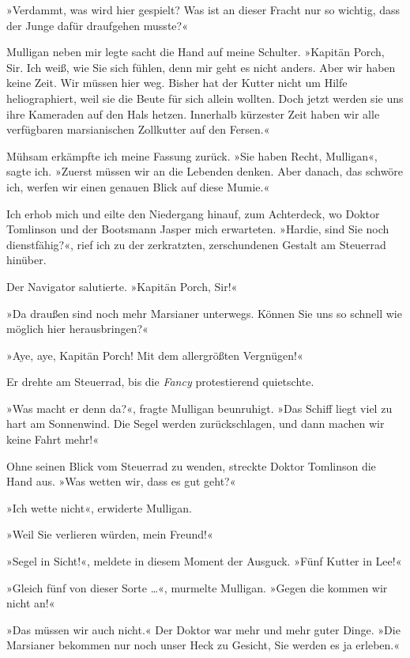 »Verdammt, was wird hier gespielt? Was ist an dieser Fracht nur so
wichtig, dass der Junge dafür draufgehen musste?«

Mulligan neben mir legte sacht die Hand auf meine Schulter.
»Kapitän Porch, Sir. Ich weiß, wie Sie sich fühlen, denn mir geht
es nicht anders. Aber wir haben keine Zeit. Wir müssen hier weg.
Bisher hat der Kutter nicht um Hilfe heliographiert, weil sie die
Beute für sich allein wollten. Doch jetzt werden sie uns ihre
Kameraden auf den Hals hetzen. Innerhalb kürzester Zeit haben wir
alle verfügbaren marsianischen Zollkutter auf den Fersen.«

Mühsam erkämpfte ich meine Fassung zurück. »Sie haben Recht,
Mulligan«, sagte ich. »Zuerst müssen wir an die Lebenden denken.
Aber danach, das schwöre ich, werfen wir einen genauen Blick auf
diese Mumie.«

\bigpar

Ich erhob mich und eilte den Niedergang hinauf, zum Achterdeck, wo
Doktor Tomlinson und der Bootsmann Jasper mich erwarteten. »Hardie,
sind Sie noch dienstfähig?«, rief ich zu der zerkratzten,
zerschundenen Gestalt am Steuerrad hinüber.

Der Navigator salutierte. »Kapitän Porch, Sir!«

»Da draußen sind noch mehr Marsianer unterwegs. Können Sie uns so
schnell wie möglich hier herausbringen?«

»Aye, aye, Kapitän Porch! Mit dem allergrößten Vergnügen!«

Er drehte am Steuerrad, bis die \emph{Fancy} protestierend
quietschte.

»Was macht er denn da?«, fragte Mulligan beunruhigt. »Das Schiff
liegt viel zu hart am Sonnenwind. Die Segel werden zurückschlagen,
und dann machen wir keine Fahrt mehr!«

Ohne seinen Blick vom Steuerrad zu wenden, streckte Doktor
Tomlinson die Hand aus. »Was wetten wir, dass es gut geht?«

»Ich wette nicht«, erwiderte Mulligan.

»Weil Sie verlieren würden, mein Freund!«

»Segel in Sicht!«, meldete in diesem Moment der Ausguck. »Fünf
Kutter in Lee!«

»Gleich fünf von dieser Sorte \ldots{}«, murmelte Mulligan. »Gegen die
kommen wir nicht an!«

»Das müssen wir auch nicht.« Der Doktor war mehr und mehr guter
Dinge. »Die Marsianer bekommen nur noch unser Heck zu Gesicht, Sie
werden es ja erleben.«

